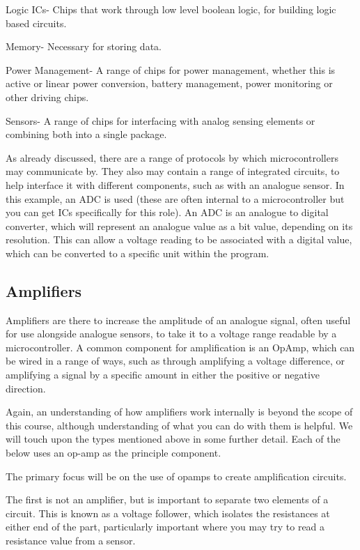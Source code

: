 \documentclass[a4paper,11pt]{report}
\begin{document}
Logic ICs- Chips that work through low level boolean logic, for building logic based circuits.

Memory- Necessary for storing data.

Power Management- A range of chips for power management, whether this is active or linear power conversion, battery management, power monitoring or other driving chips.

Sensors- A range of chips for interfacing with analog sensing elements or combining both into a single package.

As already discussed, there are a range of protocols by which microcontrollers may communicate by. They also may contain a range of integrated circuits, to help interface it with different components, such as with an analogue sensor. In this example, an ADC is used (these are often internal to a microcontroller but you can get ICs specifically for this role). An ADC is an analogue to digital converter, which will represent an analogue value as a bit value, depending on its resolution. This can allow a voltage reading to be associated with a digital value, which can be converted to a specific unit within the program.

\subsection{Amplifiers}

Amplifiers are there to increase the amplitude of an analogue signal, often useful for use alongside analogue sensors, to take it to a voltage range readable by a microcontroller. A common component for amplification is an OpAmp, which can be wired in a range of ways, such as through amplifying a voltage difference, or amplifying a signal by a specific amount in either the positive or negative direction.

Again, an understanding of how amplifiers work internally is beyond the scope of this course, although understanding of what you can do with them is helpful. We will touch upon the types mentioned above in some further detail. Each of the below uses an op-amp as the principle component.

The primary focus will be on the use of opamps to create amplification circuits.

The first is not an amplifier, but is important to separate two elements of a circuit. This is known as a voltage follower, which isolates the resistances at either end of the part, particularly important where you may try to read a resistance value from a sensor.
\end{document}
